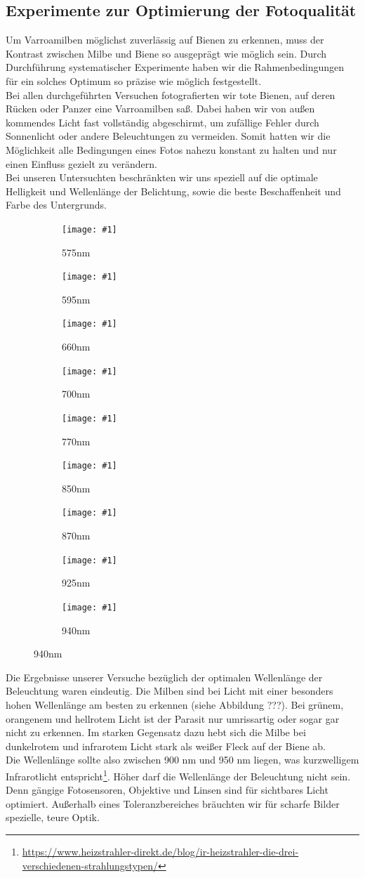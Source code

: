 \documentclass[11pt,a4paper]{article}
\newcommand{\subpicture}[2]{
    \begin{subfigure}{.3\textwidth}
        \centering
        \texttt{[image: \#1]}
        \caption{#2}
    \end{subfigure}
}
\begin{document}
\subsection{Experimente zur Optimierung der Fotoqualität}
Um Varroamilben möglichst zuverlässig auf Bienen zu erkennen, muss der Kontrast zwischen Milbe und Biene so ausgeprägt wie möglich sein. Durch Durchführung systematischer Experimente haben wir die Rahmenbedingungen für ein solches Optimum so präzise wie möglich festgestellt.\\
Bei allen durchgeführten Versuchen fotografierten wir tote Bienen, auf deren Rücken oder Panzer eine Varroamilben saß. Dabei haben wir von außen kommendes Licht fast vollständig abgeschirmt, um zufällige Fehler durch Sonnenlicht oder andere Beleuchtungen zu vermeiden. Somit hatten wir die Möglichkeit alle Bedingungen eines Fotos nahezu konstant zu halten und nur einen Einfluss gezielt zu verändern.\\
Bei unseren Untersuchten beschränkten wir uns speziell auf die optimale Helligkeit und Wellenlänge der Belichtung, sowie die beste Beschaffenheit und Farbe des Untergrunds.\\
\begin{figure}[H] \label{fig:experiment}
	\centering
        \subpicture{images/575nm.jpg}{575nm}
        \subpicture{images/595nm.jpg}{595nm}
        \subpicture{images/660nm.jpg}{660nm}
        \subpicture{images/700nm.jpg}{700nm}
        \subpicture{images/770nm.jpg}{770nm}
        \subpicture{images/850nm.jpg}{850nm}
        \subpicture{images/870nm.jpg}{870nm}
        \subpicture{images/925nm.jpg}{925nm}
        \subpicture{images/940nm.jpg}{940nm}
\end{figure}
\noindent
Die Ergebnisse unserer Versuche bezüglich der optimalen Wellenlänge der Beleuchtung waren eindeutig. Die Milben sind bei Licht mit einer besonders hohen Wellenlänge am besten zu erkennen (siehe Abbildung ???). Bei grünem, orangenem und hellrotem Licht ist der Parasit nur umrissartig oder sogar gar nicht zu erkennen. Im starken Gegensatz dazu hebt sich die Milbe bei dunkelrotem und infrarotem Licht stark als weißer Fleck auf der Biene ab.\\
Die Wellenlänge sollte also zwischen 900 nm und 950 nm liegen, was kurzwelligem Infrarotlicht entspricht\footnote{\url{https://www.heizstrahler-direkt.de/blog/ir-heizstrahler-die-drei-verschiedenen-strahlungstypen/}}. Höher darf die Wellenlänge der Beleuchtung nicht sein. Denn gängige Fotosensoren, Objektive und Linsen sind für sichtbares Licht optimiert. Außerhalb eines Toleranzbereiches bräuchten wir für scharfe Bilder spezielle, teure Optik.\\
\end{document}
